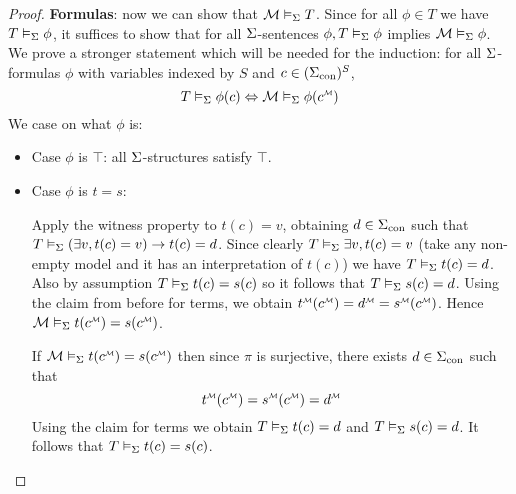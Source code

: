 \begin{proof}
    \textbf{Formulas}:
    now we can show that $\mathcal{M} \vDash_{\Sigma} T$. 
    Since for all
    $\phi \in T$ we have $T \vDash_{\Sigma} \phi$,
    it suffices to show that for all $\Sigma$-sentences
    $\phi, T \vDash_{\Sigma} \phi $ 
    implies $\mathcal{M} \vDash_{\Sigma} \phi$.
    We prove a stronger statement
    which will be needed for the induction:
    for all $\Sigma$-formulas $\phi$ with variables indexed by $S$ and 
    $c \in ({\Sigma}_\mathrm{con})^S$,
    \[
        T \modelsi \phi(c) \iff \MM \modelsi \phi(\mmintp{c})
    \]
    We case on what $\phi$ is:
    \begin{itemize}
        \item Case $\phi$ is $\top$:
        all $\Sigma$-structures satisfy $\top$.
        \item Case $\phi$ is $t = s$: 
            \begin{forward} 
                Apply the witness property to 
                $t(c) = v$,
                obtaining $d \in {\Sigma}_\mathrm{con}$ such that
                $T \vDash_{\Sigma} (\exists v, t(c) = v) \to t(c) = d$.
                Since clearly $T \vDash_{\Sigma} \exists v, t(c) = v$
                (take any non-empty model 
                and it has an interpretation of $t(c)$) 
                we have $T \vDash_{\Sigma} t(c) = d$.
                Also by assumption 
                $T \vDash_{\Sigma} t(c) = s(c)$
                so it follows that $T \vDash_{\Sigma} s(c) = d$.
                Using the claim from before for terms, 
                we obtain
                $\mmintp{t}(\mmintp{c}) = \mmintp{d} = 
                \mmintp{s}(\mmintp{c})$.
                Hence $\MM \modelsi t(\mmintp{c}) = s(\mmintp{c})$.
            \end{forward}

            \begin{backward}
                If $\MM \modelsi t(\mmintp{c}) = s(\mmintp{c})$ 
                then since $\pi$ is surjective,
                there exists $d \in {\Sigma}_\mathrm{con}$ such that 
                \[\mmintp{t}(\mmintp{c}) = \mmintp{s}(\mmintp{c})= \mmintp{d}\]
                Using the claim for terms
                we obtain $T \vDash_{\Sigma} t(c) = d$ and 
                $T \vDash_{\Sigma} s(c) = d$.
                It follows that $T \vDash_{\Sigma} t(c) = s(c)$.
            \end{backward}


\end{itemize}
\end{proof}

